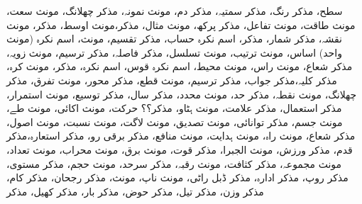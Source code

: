 سطح، مذکر
رنگ، مذکر
سمتیہ، مذکر
دم، مونث
نمونہ، مذکر
چھلانگ، مونث
سعت، مونث
طاقت، مونث
تفاعل، مذکر
پرکھ، مونث
مثال، مذکر،مونث
اوسط، مذکر، مونث
نقشہ، مذکر
شمار، مذکر، اسم نکرہ
حساب، مذکر
تقسیم، مونث، اسم نکرہ (مونث واحد)
اساس، مونث
ترتیب، مونث
تسلسل، مذکر
فاصلہ، مذکر
ترسیم، مونث
زویہ، مذکر
شعاع، مونث
راس، مونث
محیط، اسم نکرہ
قوس، اسم نکرہ، مذکر، مونث
کرہ، مذکر
کلیہ،مذکر
جواب، مذکر
ترسیم، مونث
قطع، مذکر
محور، مونث
تفرق، مذکر
چھلانگ، مونث
نقطہ، مذکر
حد، مونث
محدد، مذکر
سال، مذکر
توسیع، مونث
استمرار، مذکر
استعمال، مذکر
علامت، مونث
ہٹاو، مذکر؟؟
حرکت، مونث
اکائی، مونث
طے، مونث
جسم، مذکر
توانائی، مونث
تصدیق، مونث
لاگت، مونث
نسبت، مونث
اصول، مذکر
شعاع، مونث
راہ، مونث
ہدایت، مونث
منافع، مذکر
برقی رو، مذکر
استعارہ،مذکر
قدم، مذکر
ورزش، مونث
الجبرا، مذکر
قوت، مونث
برق، مونث
محراب، مونث
تعداد، مونث
مجموعہ، مذکر
کثافت، مونث
رقبہ، مذکر
سرحد، مونث
حجم، مذکر
مستوی، مذکر
روپ، مذکر
ادارہ، مذکر
ڈبل راٹی، مونث
ناپ، مونث، مذکر
رجحان، مذکر
کام، مذکر
وزن، مذکر
تیل، مذکر
حوض، مذکر
بار، مذکر
کھیل، مذکر

